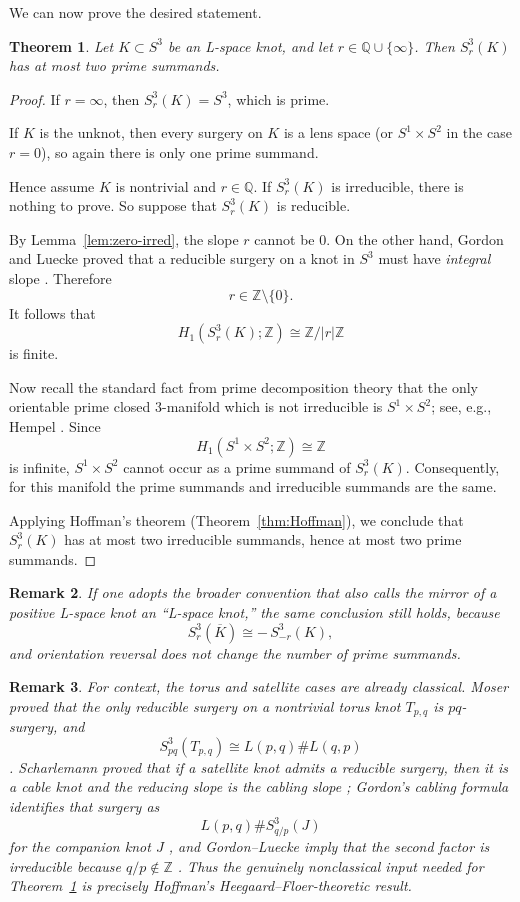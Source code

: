 \documentclass[11pt]{article}
\newtheorem{theorem}{Theorem}
\newtheorem{remark}[theorem]{Remark}
\newcommand{\Q}{\mathbb{Q}}
\newcommand{\Z}{\mathbb{Z}}
\begin{document}
We can now prove the desired statement.

\begin{theorem}\label{thm:main}
Let $K\subset S^3$ be an L-space knot, and let $r\in \Q\cup\{\infty\}$. Then $S^3_r(K)$ has at most two prime summands.
\end{theorem}

\begin{proof}
If $r=\infty$, then $S^3_r(K)=S^3$, which is prime.

If $K$ is the unknot, then every surgery on $K$ is a lens space (or $S^1\times S^2$ in the case $r=0$), so again there is only one prime summand.

Hence assume $K$ is nontrivial and $r\in \Q$. If $S^3_r(K)$ is irreducible, there is nothing to prove. So suppose that $S^3_r(K)$ is reducible.

By Lemma~\ref{lem:zero-irred}, the slope $r$ cannot be $0$. On the other hand, Gordon and Luecke proved that a reducible surgery on a knot in $S^3$ must have \emph{integral} slope \cite{GL}. Therefore
\[
r\in \Z\setminus\{0\}.
\]
It follows that
\[
H_1\!\left(S^3_r(K);\Z\right)\cong \Z/|r|\Z
\]
is finite.

Now recall the standard fact from prime decomposition theory that the only orientable prime closed $3$-manifold which is not irreducible is $S^1\times S^2$; see, e.g., Hempel \cite{Hempel}. Since
\[
H_1(S^1\times S^2;\Z)\cong \Z
\]
is infinite, $S^1\times S^2$ cannot occur as a prime summand of $S^3_r(K)$. Consequently, for this manifold the prime summands and irreducible summands are the same.

Applying Hoffman's theorem (Theorem~\ref{thm:Hoffman}), we conclude that $S^3_r(K)$ has at most two irreducible summands, hence at most two prime summands.
\end{proof}

\begin{remark}
If one adopts the broader convention that also calls the mirror of a positive L-space knot an ``L-space knot,'' the same conclusion still holds, because
\[
S^3_r(\overline K)\cong -\,S^3_{-r}(K),
\]
and orientation reversal does not change the number of prime summands.
\end{remark}

\begin{remark}
For context, the torus and satellite cases are already classical. Moser proved that the only reducible surgery on a nontrivial torus knot $T_{p,q}$ is $pq$-surgery, and
\[
S^3_{pq}(T_{p,q})\cong L(p,q)\# L(q,p)
\]
\cite{Moser}. Scharlemann proved that if a satellite knot admits a reducible surgery, then it is a cable knot and the reducing slope is the cabling slope \cite{Scharlemann}; Gordon's cabling formula identifies that surgery as
\[
L(p,q)\# S^3_{q/p}(J)
\]
for the companion knot $J$ \cite{GordonSatellite}, and Gordon--Luecke imply that the second factor is irreducible because $q/p\notin \Z$ \cite{GL}. Thus the genuinely nonclassical input needed for Theorem~\ref{thm:main} is precisely Hoffman's Heegaard--Floer-theoretic result.
\end{remark}
\end{document}
